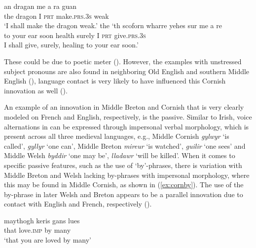 \documentclass[output=paper,colorlinks,citecolor=brown]{langscibook}
\begin{document}
\ea
\ea
\settowidth{}
\gll an	dragan	me	a 			ra			 					guan \\
	the	dragon	I		\textsc{prt}		make.\textsc{prs}.\textsc{3s} 	weak\\ 
\glt `I shall make the dragon weak.' 
\ex 
\gll the	`th		scoforn		wharre		yehes		sur			me	a			re\\
	to	your	ear				soon			health	surely	I		\textsc{prt}		give.\textsc{prs}.\textsc{3s}\\
 \glt I shall give, surely, healing to your ear soon.'
\z
\z

\noindent These could be due to poetic meter (\citealt{mm:eska_remarks_2021}). However, the examples with unstressed subject pronouns are also found in neighboring Old English and southern Middle English (\citealt{mm:krochetal2000middle}), language contact is very likely to have influenced this Cornish innovation as well  (\cite{mm:WillisForth}).

An example of an innovation in Middle Breton and Cornish that is very clearly modeled on French and English, respectively, is the passive. Similar to Irish, voice alternations in  can be expressed through impersonal verbal morphology, which is present across all three medieval languages, e.g., Middle Cornish \textit{gylwyr} `is called', \textit{gyllyr} `one can', Middle Breton \textit{mireur} `is watched', \textit{guilir} `one sees' and Middle Welsh \textit{byddir} `one may be', \textit{lladawr} `will be killed'. When it comes to specific passive features, such as the use of `by'-phrases, there is variation with Middle Breton and Welsh lacking by-phrases with impersonal morphology, where this may be found in Middle Cornish, as shown in (\ref{ex:cornby}).  The use of the by-phrase in later Welsh and Breton appears to be a parallel innovation due to contact with English and French, respectively (\citealt{mm:WillisForth}). 

\ea
\settowidth{}
\gll maythogh keris gans lues\\
that love.\textsc{imp} by many\\
\glt `that you are loved by many' 
\label{ex:cornby}
\z 
\end{document}
